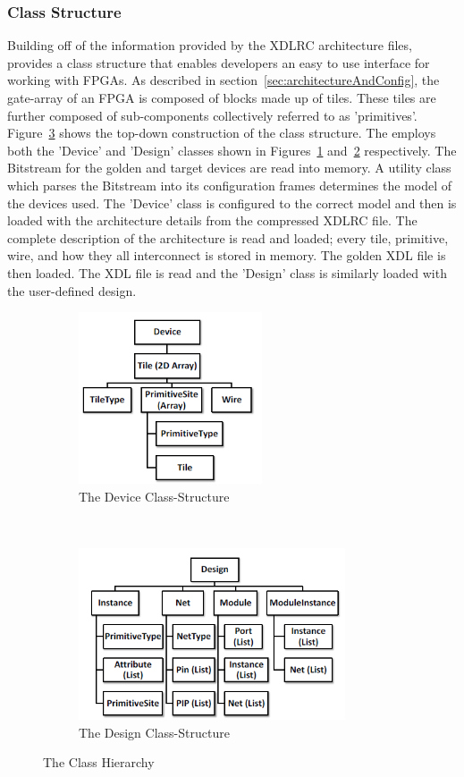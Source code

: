 \subsubsection{Class Structure} \label{sec:classStructure}
Building off of the information provided by the XDLRC architecture files, \RapidSmith provides a class structure that enables developers an easy to use interface for working with \acrshort{FPGA}s.
As described in section~\ref{sec:architectureAndConfig}, the gate-array of an \acrshort{FPGA} is composed of blocks made up of tiles.
These tiles are further composed of sub-components collectively referred to as 'primitives'.
Figure~\ref{fig:classStructures} shows the top-down construction of the \RapidSmith class structure.
The \NameNoPeriod employs both the 'Device' and 'Design' classes shown in Figures~\ref{fig:rapidSmithDevice} and~\ref{fig:rapidSmithDesign} respectively.
The \gls{Bitstream} for the \gls{golden} and \gls{target} devices are read into memory. 
A utility class which parses the \gls{Bitstream} into its configuration frames determines the model of the devices used.
The 'Device' class is configured to the correct model and then is loaded with the architecture details from the compressed XDLRC file.
The complete description of the architecture is read and loaded; every tile, primitive, wire, and how they all interconnect is stored in memory.
The \gls{golden} \acrshort{XDL} file is then loaded.
The \acrshort{XDL} file is read and the 'Design' class is similarly loaded with the user-defined design.
\begin{figure}[h]
	\centering
	\begin{subfigure}[t]{0.5\textwidth}
		\centering
		\includegraphics[height=2in]{Figures/rapidSmithDevice}
		\caption{The Device Class-Structure}
		\label{fig:rapidSmithDevice}
	\end{subfigure}%
	~ 
	\begin{subfigure}[t]{0.5\textwidth}
		\centering
		\includegraphics[height=2in]{Figures/rapidSmithDesign}
		\caption{The Design Class-Structure}
		\label{fig:rapidSmithDesign}
	\end{subfigure}
	\caption{The \RapidSmith Class Hierarchy~\cite{rapidSmithManual}}
	\label{fig:classStructures}
\end{figure}
